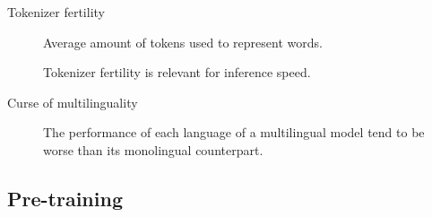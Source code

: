 \begin{description}
    \item[Tokenizer fertility] 
        Average amount of tokens used to represent words.

        \begin{remark}
            Tokenizer fertility is relevant for inference speed.
        \end{remark}

    \item[Curse of multilinguality] 
        The performance of each language of a multilingual model tend to be worse than its monolingual counterpart.
\end{description}


\subsection{Pre-training}


